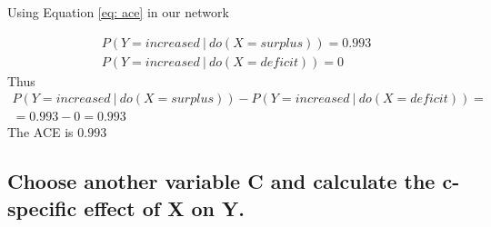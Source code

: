 \documentclass[11pt]{article}
\newcommand\given[1][]{\:#1\vert\:}
\begin{document}
Using Equation \ref{eq: ace} in our network

\begin{align}
P(Y=increased \given do(X=surplus)) = 0.993 \\
P(Y=increased\given do(X=deficit)) = 0
\end{align}
Thus
\begin{align*}
P(Y=increased \given do(X=surplus)) - P(Y=increased\given do(X=deficit)) = \\
=  0.993 - 0 = 0.993
\end{align*}
The ACE is $0.993$
\subsection{Choose another variable C and calculate the c-specific effect of X on Y.}
\end{document}
